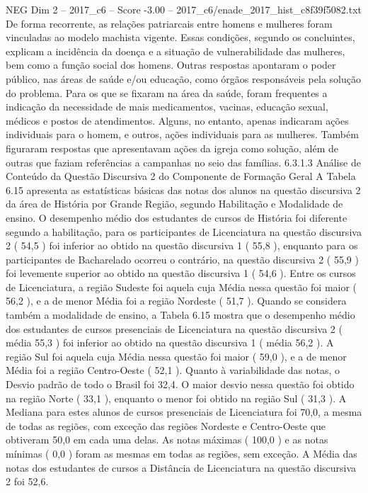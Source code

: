 \begin{textsample}{NEG Dim 2 – 2017\_c6 – Score -3.00 – 2017\_c6/enade\_2017\_hist\_c8f39f5082.txt}
De forma recorrente, as relações patriarcais entre homens e mulheres foram vinculadas ao modelo machista vigente.
Essas condições, segundo os concluintes, explicam a incidência da doença e a situação de vulnerabilidade das mulheres, bem como a função social dos homens.
Outras respostas apontaram o poder público, nas áreas de saúde e/ou educação, como órgãos responsáveis pela solução do problema.
Para os que se fixaram na área da saúde, foram frequentes a indicação da necessidade de mais medicamentos, vacinas, educação sexual, médicos e postos de atendimentos.
Alguns, no entanto, apenas indicaram ações individuais para o homem, e outros, ações individuais para as mulheres.
Também figuraram respostas que apresentavam ações da igreja como solução, além de outras que faziam referências a campanhas no seio das famílias. 6.3.1.3 Análise de Conteúdo da Questão Discursiva 2 do Componente de Formação Geral A Tabela 6.15 apresenta as estatísticas básicas das notas dos alunos na questão discursiva 2 da área de História por Grande Região, segundo Habilitação e Modalidade de ensino.
O desempenho médio dos estudantes de cursos de História foi diferente segundo a habilitação, para os participantes de Licenciatura na questão discursiva 2 ( 54,5 ) foi inferior ao obtido na questão discursiva 1 ( 55,8 ), enquanto para os participantes de Bacharelado ocorreu o contrário, na questão discursiva 2 ( 55,9 ) foi levemente superior ao obtido na questão discursiva 1 ( 54,6 ).
Entre os cursos de Licenciatura, a região Sudeste foi aquela cuja Média nessa questão foi maior ( 56,2 ), e a de menor Média foi a região Nordeste ( 51,7 ).
Quando se considera também a modalidade de ensino, a Tabela 6.15 mostra que o desempenho médio dos estudantes de cursos presenciais de Licenciatura na questão discursiva 2 ( média 55,3 ) foi inferior ao obtido na questão discursiva 1 ( média 56,2 ).
A região Sul foi aquela cuja Média nessa questão foi maior ( 59,0 ), e a de menor Média foi a região Centro-Oeste ( 52,1 ).
Quanto à variabilidade das notas, o Desvio padrão de todo o Brasil foi 32,4.
O maior desvio nessa questão foi obtido na região Norte ( 33,1 ), enquanto o menor foi obtido na região Sul ( 31,3 ).
A Mediana para estes alunos de cursos presenciais de Licenciatura foi 70,0, a mesma de todas as regiões, com exceção das regiões Nordeste e Centro-Oeste que obtiveram 50,0 em cada uma delas.
As notas máximas ( 100,0 ) e as notas mínimas ( 0,0 ) foram as mesmas em todas as regiões, sem exceção.
A Média das notas dos estudantes de cursos a Distância de Licenciatura na questão discursiva 2 foi 52,6.

\end{textsample}
